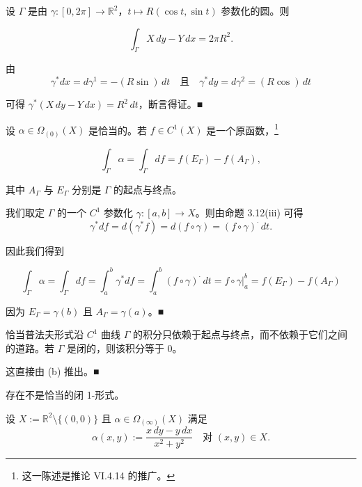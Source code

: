 \begin{example}

\begin{items}
\item

设 $ \Gamma $ 是由 $ \gamma : [0, 2\pi]\to\mathbb{R}^{2} $，$ t\mapsto R(\cos t, \sin t) $ 参数化的圆。则

\[
\int_{\Gamma}X\,dy-Y\,dx=2\pi R^{2} .
\]

\proofhead
由
\[
\gamma^{*}dx=d\gamma^{1}=-(R\sin)\,dt\quad\text{且}\quad\gamma^{*}dy=d\gamma^{2}=(R\cos)\,dt
\]

可得 $ \gamma^{*}(X\,dy-Y\,dx)=R^{2}\,dt $，断言得证。\nobreak\hspace{0.35em}■

\item

设 $ \alpha \in \Omega_{(0)}(X) $ 是恰当的。若 $ f \in C^1(X) $ 是一个原函数，\footnote{这一陈述是推论 VI.4.14 的推广。}

\[
\int_{\Gamma}\alpha=\int_{\Gamma}df=f(E_{\Gamma})-f(A_{\Gamma}) ,
\]

其中 $ A_{\Gamma} $ 与 $ E_{\Gamma} $ 分别是 $ \Gamma $ 的起点与终点。

\proofhead
我们取定 $ \Gamma $ 的一个 $ C^1 $ 参数化 $ \gamma : [a, b]\to X $。则由命题 3.12(iii) 可得
\[
\gamma^{*}df=d(\gamma^{*}f)=d(f\circ\gamma)=(f\circ\gamma)^{\cdot}\,dt .
\]

因此我们得到

\[
\int_{\Gamma}\alpha=\int_{\Gamma}df=\int_a^b\gamma^{*}df=\int_a^b(f\circ\gamma)^{\cdot}\,dt=f\circ\gamma\big|_a^b=f(E_{\Gamma})-f(A_{\Gamma})
\]

因为 $ E_{\Gamma}=\gamma(b) $ 且 $ A_{\Gamma}=\gamma(a) $。\nobreak\hspace{0.35em}■

\item

恰当普法夫形式沿 $ C^1 $ 曲线 $ \Gamma $ 的积分只依赖于起点与终点，而不依赖于它们之间的道路。若 $ \Gamma $ 是闭的，则该积分等于 0。

\proofhead
这直接由 (b) 推出。\nobreak\hspace{0.35em}■
\item

存在不是恰当的闭 1-形式。

\proofhead
设 $ X:=\mathbb{R}^{2}\setminus\{(0, 0)\} $ 且 $ \alpha \in \Omega_{(\infty)}(X) $ 满足
\[
\alpha(x, y):=\frac{x\,dy-y\,dx}{x^{2}+y^{2}}\quad\text{对 }(x, y)\in X .
\]


\end{items}
\end{example}
